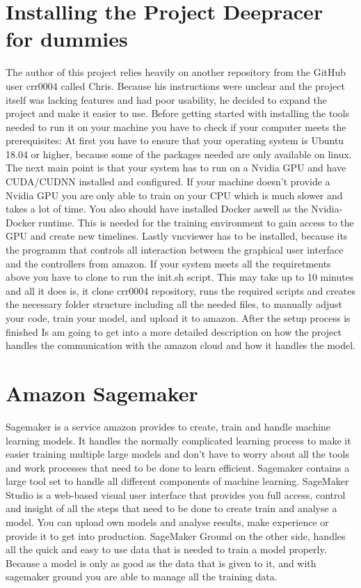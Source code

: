 \section{Installing the Project Deepracer for dummies}
The author of this project relies heavily on another repository from the GitHub user crr0004 called Chris. Because his instructions were unclear and the project itself was lacking features and had poor usability, he decided to expand the project and make it easier to use. 
Before getting started with installing the tools needed to run it on your machine you have to check if your computer meets the prerequisites:
At first you have to ensure that your operating system is Ubuntu 18.04 or higher, because some of the packages needed are only available on linux.
The next main point is that your system has to run on a Nvidia GPU and have CUDA/CUDNN installed and configured. If your machine doesn't provide a Nvidia GPU you are only able to train on your CPU which is much slower and takes a lot of time.
You also should have installed Docker aswell as the Nvidia-Docker runtime. This is needed for the training environment to gain access to the GPU and create new timelines.
Lastly vncviewer has to be installed, because its the programm that controls all interaction between the graphical user interface and the controllers from amazon.
If your system meets all the requiretments above you have to clone to run the init.sh script.
This may take up to 10 minutes and all it does is, it clone crr0004 repository, runs the required scripts and creates the necessary folder structure including all the needed files, to manually adjust your code, train your model, and upload it to amazon.
After the setup process is finished Is am going to get into a more detailed description on how the project handles the communication with the amazon cloud and how it handles the model.

 \section{Amazon Sagemaker}
 Sagemaker is a service amazon provides to create, train and handle machine learning models. It handles the normally complicated  learning process to make it easier training multiple large models and don't have to worry about all the tools and work processes that need to be done to learn efficient. Sagemaker contains a large tool set to handle all different components of machine learning. 
 SageMaker Studio is a web-based visual user interface that provides you full access, control and insight of all the steps that need to be done to create train and analyse a model. You can upload own models and analyse results, make experience or provide it to get into production. 
SageMaker Ground on the other side, handles all the quick and easy to use data that is needed to train a model properly. Because a model is only as good as the data that is given to it, and with sagemaker ground you are able to manage all the training data.

